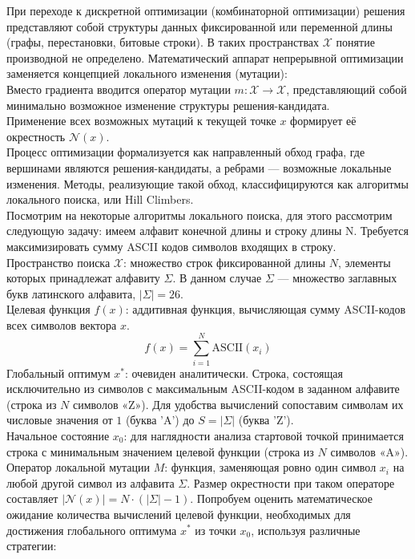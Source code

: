 При переходе к дискретной оптимизации (комбинаторной оптимизации) решения представляют собой структуры данных фиксированной или переменной длины (графы, перестановки, битовые строки). В таких пространствах $\mathcal{X}$ понятие производной не определено. Математический аппарат непрерывной оптимизации заменяется концепцией локального изменения (мутации): \\
Вместо градиента вводится оператор мутации $m: \mathcal{X} \to \mathcal{X}$, представляющий собой минимально возможное изменение структуры решения-кандидата. \\
Применение всех возможных мутаций к текущей точке $x$ формирует её окрестность $\mathcal{N}(x)$. \\
Процесс оптимизации формализуется как направленный обход графа, где вершинами являются решения-кандидаты, а ребрами — возможные локальные изменения. Методы, реализующие такой обход, классифицируются как алгоритмы локального поиска, или Hill Climbers. \\
Посмотрим на некоторые алгоритмы локального поиска, для этого рассмотрим следующую задачу: имеем алфавит конечной длины и строку длины N. Требуется максимизировать сумму ASCII кодов символов входящих в строку. \\
Пространство поиска $\mathcal{X}$: множество строк фиксированной длины $N$, элементы которых принадлежат алфавиту $\Sigma$. В данном случае $\Sigma$ — множество заглавных букв латинского алфавита, $|\Sigma| = 26$. \\
Целевая функция $f(x)$: аддитивная функция, вычисляющая сумму ASCII-кодов всех символов вектора $x$. \\
$$f(x) = \sum_{i=1}^N \text{ASCII}(x_i)$$
Глобальный оптимум $x^*$: очевиден аналитически. Строка, состоящая исключительно из символов с максимальным ASCII-кодом в заданном алфавите (строка из $N$ символов «Z»). Для удобства вычислений сопоставим символам их числовые значения от $1$ (буква 'A') до $S = |\Sigma|$ (буква 'Z'). \\
Начальное состояние $x_0$: для наглядности анализа стартовой точкой принимается строка с минимальным значением целевой функции (строка из $N$ символов «A»). \\
Оператор локальной мутации $M$: функция, заменяющая ровно один символ $x_i$ на любой другой символ из алфавита $\Sigma$. Размер окрестности при таком операторе составляет $|\mathcal{N}(x)| = N \cdot (|\Sigma| - 1)$.
Попробуем оценить математическое ожидание количества вычислений целевой функции, необходимых для достижения глобального оптимума $x^*$ из точки $x_0$, используя различные стратегии: \\
